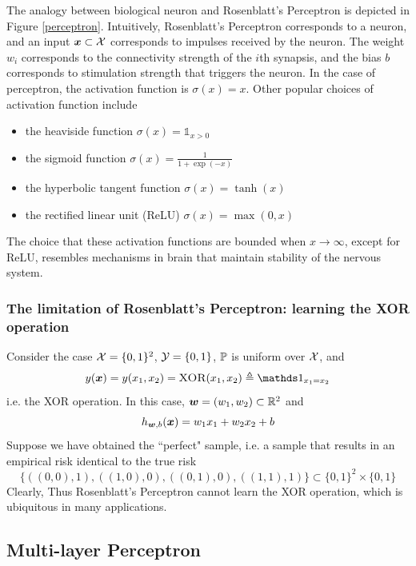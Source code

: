 \documentclass{article}
\newcommand{\ind}{{\mathds 1}}
\begin{document}
The analogy between biological neuron and Rosenblatt's Perceptron is depicted in Figure \ref{perceptron}.
Intuitively, Rosenblatt's Perceptron corresponds to a neuron, and an input ${\bm x} \subset {\mathcal X}$ corresponds to impulses received by the neuron.
The weight $w_i$ corresponds to the connectivity strength of the $i$th synapsis, and the bias $b$ corresponds to stimulation strength that triggers the neuron.
In the case of perceptron, the activation function is $\sigma (x) = x$.
Other popular choices of activation function include
\begin{itemize}
\item the heaviside function $\sigma (x) = \ind_{x > 0}$
\item the sigmoid function $\sigma (x) = \frac1{1 + \exp (-x)}$
\item the hyperbolic tangent function $\sigma (x) = \tanh (x)$
\item the rectified linear unit (ReLU) $\sigma (x) = \max (0, x)$
\end{itemize}
The choice that these activation functions are bounded when $x \rightarrow \infty$, except for ReLU, resembles mechanisms in brain that maintain stability of the nervous system.

\subsubsection{The limitation of Rosenblatt's Perceptron: learning the \textsc{XOR} operation}

Consider the case ${\mathcal X} = \{0, 1\}^2$, ${\mathcal Y} = \{0, 1\}$, ${\mathbb P}$ is uniform over ${\mathcal X}$, and
\[
y(\bmx)
= y(x_1, x_2)
= \textsc{XOR} (x_1, x_2) \triangleq \ind_{x_1 = x_2}
\]
i.e. the XOR operation.
In this case, ${\bm w} = (w_1, w_2) \subset {\mathbb R}^2$ and
\[
h_{{\bm w}, b} ({\bm x}) = w_1 x_1 + w_2 x_2 + b
\]
Suppose we have obtained the ``perfect" sample, i.e. a sample that results in an empirical risk identical to the true risk
\[
\{((0, 0), 1), ((1, 0), 0), ((0, 1), 0), ((1, 1), 1)\} \subset \{0, 1\}^2 \times \{0, 1\}
\]
Clearly,
Thus Rosenblatt's Perceptron cannot learn the XOR operation, which is ubiquitous in many applications.

\subsection{Multi-layer Perceptron}
\end{document}
